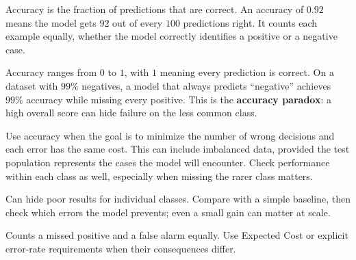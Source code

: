 Accuracy is the fraction of predictions that are correct. An accuracy of $0.92$ means the model gets $92$ out of every $100$ predictions right. It counts each example equally, whether the model correctly identifies a positive or a negative case.

\begin{metricformula}
\end{metricformula}

Accuracy ranges from $0$ to $1$, with $1$ meaning every prediction is correct. On a dataset with $99\%$ negatives, a model that always predicts ``negative'' achieves $99\%$ accuracy while missing every positive. This is the \textbf{accuracy paradox}: a high overall score can hide failure on the less common class.


Use accuracy when the goal is to minimize the number of wrong decisions and each error has the same cost. This can include imbalanced data, provided the test population represents the cases the model will encounter. Check performance within each class as well, especially when missing the rarer class matters.


{
\item Can hide poor results for individual classes. Compare with a simple baseline, then check which errors the model prevents; even a small gain can matter at scale.
\item Counts a missed positive and a false alarm equally. Use Expected Cost or explicit error-rate requirements when their consequences differ.
}

